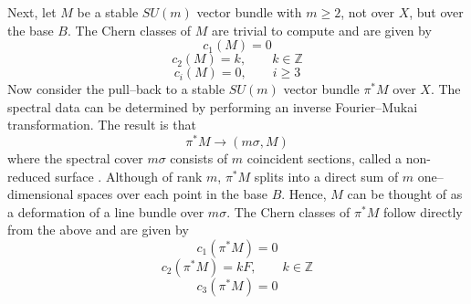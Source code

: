 \documentclass[a4paper,12pt]{article}
\numberwithin{equation}{section}
\theoremstyle{plain}
\begin{document}
Next, let $M$ be a stable $SU(m)$ vector bundle with $m\geq2$, 
not over $X$, but over the base $B$. The Chern classes of $M$ are trivial to
compute and are given by
\begin{equation}
c_{1}(M)=0
\label{eq:128}
\end{equation}
\begin{equation}
c_{2}(M)=k, \qquad k\in {\mathbb Z}
\label{eq:129}
\end{equation}
\begin{equation}
c_{i}(M)=0, \qquad i\geq3
\label{eq:130}
\end{equation}
Now consider the pull--back to a stable $SU(m)$ vector bundle 
$\pi^{*}M$ over $X$. The spectral data can be determined by performing an
inverse Fourier--Mukai transformation. The result is that
\begin{equation}
\pi^{*}M \longrightarrow (m\sigma, M)
\label{eq:131}
\end{equation}
where the spectral cover $m\sigma$ consists of $m$ coincident sections, called
a non-reduced surface \cite{BJPS}. Although of rank $m$, 
$\pi^{*}M$ splits into a direct
sum of $m$ one--dimensional spaces over each point in the base $B$. Hence, $M$
can be thought of as a deformation of 
a line bundle over $m\sigma$. The Chern classes of
$\pi^{*}M$ follow directly from the above and are given by
\begin{equation}
c_{1}(\pi^{*}M)=0
\label{eq:132}
\end{equation}
\begin{equation}
c_{2}(\pi^{*}M)=kF, \qquad k \in {\mathbb Z}
\label{eq:133}
\end{equation}
\begin{equation}
c_{3}(\pi^{*}M)=0
\label{eq:134}
\end{equation}
\end{document}
